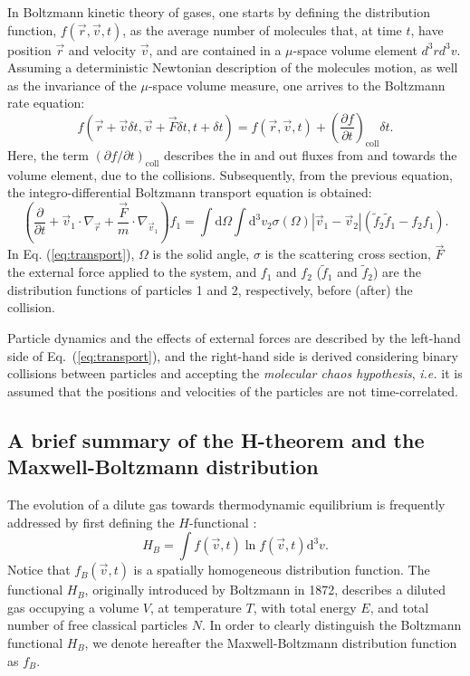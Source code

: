 In Boltzmann kinetic theory of gases, one starts by defining the distribution function, 
$f(\vec{r},\vec{v},t)$, as the average number of molecules that, at time $t$, have 
position $\vec r$ and velocity $\vec v$, and are contained in a $\mu$-space volume element $d^3rd^3v$.
Assuming a deterministic Newtonian description of the molecules motion, 
as well as the invariance of the $\mu$-space volume measure, one arrives to the Boltzmann rate equation:
%
\begin{equation}
	f(\vec{r}+\vec{v}\delta t, \vec{v}+\vec{F} \delta t, t+\delta t)=f(\vec{r},\vec{v},t)+\left( \frac{\partial f}{\partial t} \right)_{\textrm{coll}} \delta t.
\end{equation}
%
Here, the term $\left(\partial f/\partial t\right)_{\textrm{coll}}$
describes the in and out fluxes from and towards the volume element, due to the collisions.
Subsequently, from the previous equation, the integro-differential Boltzmann transport equation is obtained:
%
\begin{equation}\label{eq:transport}
  \left(
    \frac{\partial}{\partial t}+\vec{v}_1 \cdot\nabla_{\vec r}
    +\frac{\vec{F}}{m}\cdot\nabla_{\vec v_1}
  \right)f_1=\int\mathrm{d}\Omega\int
    \mathrm{d}^{3}v_2\sigma(\Omega)|\vec{v}_1-\vec{v}_2|(\tilde f_2\tilde f_1-f_2f_1).
\end{equation}
%
In Eq. (\ref{eq:transport}), $\Omega$ is the solid angle, $\sigma$ is the
scattering cross section, $\vec F$ the
external force applied to the system, and $f_1$ and $f_2$ ($\tilde f_1$ and $\tilde f_2$) are the distribution
functions of particles 1 and 2, respectively, before (after) the collision.

Particle dynamics and the effects of external forces are described
by the left-hand side of Eq.~(\ref{eq:transport}), and the right-hand side
is derived considering binary collisions between particles and accepting
the \textit{molecular chaos hypothesis}, \textit{i.e.} it is assumed that
the positions and velocities of the particles are not time-correlated.


\subsection{A brief summary of the H-theorem and the Maxwell-Boltzmann distribution}

The evolution of a dilute gas towards thermodynamic equilibrium is frequently
addressed by first defining the $H$-functional \cite{bib:tolman,bib:huang}:
%
\begin{equation}\label{eq:hbfunctional}
   H_{B}=\int f(\vec{v},t) \ln f(\vec{v},t) \mathrm{d}^{3}v.
\end{equation} 
%
Notice that $f_B(\vec{v},t)$ is a spatially homogeneous distribution function.
The functional $H_B$,
originally introduced by Boltzmann in 1872,
describes a diluted gas occupying a volume $V$, at temperature $T$, with total energy $E$, and total
number of free classical particles $N$.
In order to clearly distinguish the Boltzmann functional $H_B$, we denote hereafter
the Maxwell-Boltzmann distribution function as $f_B$.

